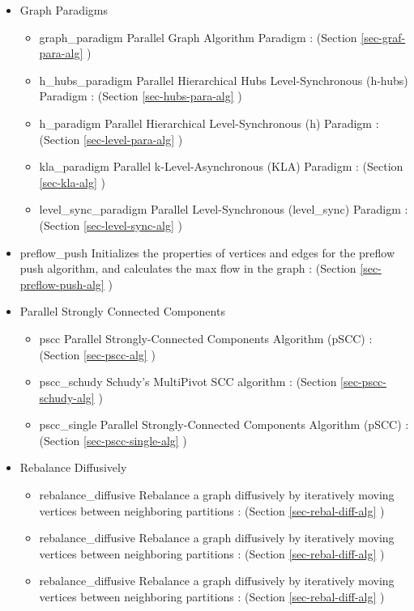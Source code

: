 \begin{itemize}
\item
Graph Paradigms
\begin{itemize}
\item
graph\_paradigm 
\newline
Parallel Graph Algorithm Paradigm
 : (Section \ref{sec-graf-para-alg} )
\item
h\_hubs\_paradigm 
\newline
Parallel Hierarchical Hubs Level-Synchronous (h-hubs) Paradigm
 : (Section \ref{sec-hubs-para-alg} )
\item
h\_paradigm 
\newline
Parallel Hierarchical Level-Synchronous (h) Paradigm
 : (Section \ref{sec-level-para-alg} )
\item
kla\_paradigm 
\newline
Parallel k-Level-Asynchronous (KLA) Paradigm
 : (Section \ref{sec-kla-alg} )
\item
level\_sync\_paradigm 
\newline
Parallel Level-Synchronous (level\_sync) Paradigm
 : (Section \ref{sec-level-sync-alg} )
\end{itemize}

\item
preflow\_push 
\newline
Initializes the properties of vertices and edges for the preflow push algorithm, and calculates the max flow in the graph
 : (Section \ref{sec-preflow-push-alg} )

\item
Parallel Strongly Connected Components
\begin{itemize}
\item
pscc 
\newline
Parallel Strongly-Connected Components Algorithm (pSCC) 
 : (Section \ref{sec-pscc-alg} )
\item
pscc\_schudy
\newline
Schudy's MultiPivot SCC algorithm
 : (Section \ref{sec-pscc-schudy-alg} )
\item
pscc\_single
\newline
Parallel Strongly-Connected Components Algorithm (pSCC) 
 : (Section \ref{sec-pscc-single-alg} )
\end{itemize}

\item
Rebalance Diffusively
\begin{itemize}
\item
rebalance\_diffusive 
\newline
Rebalance a graph diffusively by iteratively moving vertices between neighboring partitions
 : (Section \ref{sec-rebal-diff-alg} )
\item
rebalance\_diffusive
\newline
Rebalance a graph diffusively by iteratively moving vertices between neighboring partitions
 : (Section \ref{sec-rebal-diff-alg} )
\item
rebalance\_diffusive
\newline
Rebalance a graph diffusively by iteratively moving vertices between neighboring partitions
 : (Section \ref{sec-rebal-diff-alg} )
\end{itemize}


\end{itemize}
